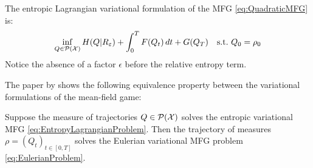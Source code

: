\documentclass[../report.tex]{subfiles}
\begin{document}
The entropic Lagrangian variational formulation of the MFG \eqref{eq:QuadraticMFG} is:
\begin{equation}\label{eq:EntropyLagrangianProblem}
	\inf_{Q\in\mathcal{P}(\mathcal{X})}
	H(Q|R_{\varepsilon}) + \int_0^T F(Q_t)\,dt + G(Q_T)\quad
	\mathrm{s.t.}\ Q_0 = \rho_0
\end{equation}
Notice the absence of a factor $\epsilon$ before the relative entropy term.

The paper by \textcite[sec.~4.2]{benamou2018entropy} shows the following equivalence property between the variational formulations of the mean-field game:
\begin{prop}
	Suppose the measure of trajectories $Q \in \mathcal{P}(\mathcal{X})$ solves the entropic variational MFG \eqref{eq:EntropyLagrangianProblem}. Then the trajectory of measures $\rho = (Q_t)_{t\in[0,T]}$ solves the Eulerian variational MFG problem \eqref{eq:EulerianProblem}.
\end{prop}
\end{document}
